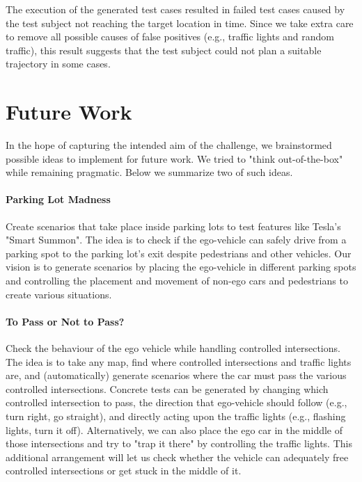 \documentclass[conference]{IEEEtran}
\begin{document}
The execution of the generated test cases resulted in failed test cases caused by the test subject not reaching the target location in time. Since we take extra care to remove all possible causes of false positives (e.g., traffic lights and random traffic), this result suggests that the test subject could not plan a suitable trajectory in some cases.

\section{Future Work}

In the hope of capturing the intended aim of the challenge, we brainstormed possible ideas to implement for future work. We tried to "think out-of-the-box" while remaining pragmatic. Below we summarize two of such ideas.

\paragraph{Parking Lot Madness}
Create scenarios that take place inside parking lots to test features like Tesla's "Smart Summon". The idea is to check if the ego-vehicle can safely drive from a parking spot to the parking lot's exit despite pedestrians and other vehicles. Our vision is to generate scenarios by placing the ego-vehicle in different parking spots and controlling the placement and movement of non-ego cars and pedestrians to create various situations.

\paragraph{To Pass or Not to Pass?}
Check the behaviour of the ego vehicle while handling controlled intersections. The idea is to take any map, find where controlled intersections and traffic lights are, and (automatically) generate scenarios where the car must pass the various controlled intersections.
%
Concrete tests can be generated by changing which controlled intersection to pass, the direction that ego-vehicle should follow (e.g., turn right, go straight), and directly acting upon the traffic lights (e.g., flashing lights, turn it off).
%
Alternatively, we can also place the ego car in the middle of those intersections and try to "trap it there" by controlling the traffic lights. This additional arrangement will let us check whether the vehicle can adequately free controlled intersections or get stuck in the middle of it.



\end{document}
